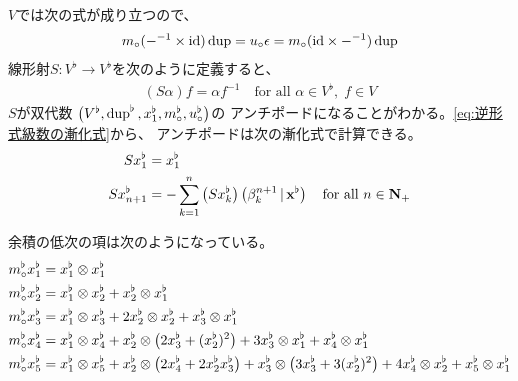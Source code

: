 {	$V$では次の式が成り立つので、
	\begin{equation*}\begin{split}
		m_\circ(-^{-1}\times{\ensuremath{\operatorname{id}}})\mathinner{\operatorname{dup}} = u_\circ\epsilon 
		= m_\circ({\operatorname{id}}\times-^{-1})\mathinner{\operatorname{dup}}
	\end{split}\end{equation*}
	線形射$S:V^\flat\to V^\flat$を次のように定義すると、
	\begin{equation*}\begin{split}
		(S\alpha) f = \alpha f^{-1}
		\quad\text{for all } \alpha\in V^\flat,\; f\in V
	\end{split}\end{equation*}
	$S$が双代数
	$\mathinner{\bigl({V^\flat,\mathinner{\operatorname{dup}}^\flat,x_1^\flat,m_\circ^\flat,u_\circ^\flat}\bigr)}$の
	アンチポードになることがわかる。\eqref{eq:逆形式級数の漸化式}から、
	アンチポードは次の漸化式で計算できる。
	\begin{equation*}\begin{split}
		Sx_1^\flat &= x_1^\flat \\
		Sx_{n+1}^\flat &= -\sum_{k=1}^n \mathinner{\bigl({Sx_k^\flat}\bigr)}
		\mathinner{\bigl({\beta^{n+1}_k\,\vert\,\mathbf{x}^\flat}\bigr)}
		\quad\text{for all } n\in\mathbf{N}_+
	\end{split}\end{equation*}

	余積の低次の項は次のようになっている。
	\begin{equation*}\begin{split}
		m_\circ^\flat x_1^\flat &= x_1^\flat\otimes x_1^\flat \\
		m_\circ^\flat x_2^\flat &= x_1^\flat\otimes x_2^\flat 
			+ x_2^\flat\otimes x_1^\flat \\
		m_\circ^\flat x_3^\flat &= x_1^\flat\otimes x_3^\flat 
			+ 2 x_2^\flat\otimes x_2^\flat + x_3^\flat\otimes x_1^\flat \\
		m_\circ^\flat x_4^\flat &= x_1^\flat\otimes x_4^\flat 
			+ x_2^\flat\otimes \mathinner{\bigl({2 x_3^\flat + (x_2^\flat)^2}\bigr)} 
			+ 3 x_3^\flat\otimes x_1^\flat + x_4^\flat\otimes x_1^\flat \\
		m_\circ^\flat x_5^\flat &= x_1^\flat\otimes x_5^\flat 
			+ x_2^\flat\otimes \mathinner{\bigl({2 x_4^\flat + 2 x_2^\flat x_3^\flat}\bigr)} 
			+ x_3^\flat\otimes \mathinner{\bigl({3 x_3^\flat + 3 (x_2^\flat)^2}\bigr)} 
			+ 4 x_4^\flat\otimes x_2^\flat 
			+ x_5^\flat\otimes x_1^\flat 
	\end{split}\end{equation*}

}
